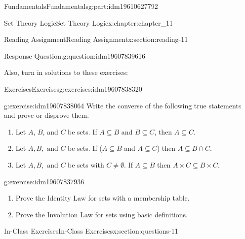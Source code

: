 \documentclass[oneside,10pt,]{book}
\numberwithin{equation}{section}
\begin{document}
\begin{partptx}{Fundamentals}{}{Fundamentals}{}{}{g:part:idm19610627792}
\begin{chapterptx}{Set Theory Logic}{}{Set Theory Logic}{}{}{x:chapter:chapter_11}
\begin{sectionptx}{Reading Assignment}{}{Reading Assignment}{}{}{x:section:reading-11}
\begin{question}{Response Question.}{g:question:idm19607839616}
\end{question}
Also, turn in solutions to these exercises:%
%
%
\typeout{************************************************}
\typeout{************************************************}
%
\begin{exercises-subsection-numberless}{Exercises}{}{Exercises}{}{}{g:exercises:idm19607838320}
\par\medskip\noindent%
%
\begin{exercisegroup}
\begin{divisionexerciseeg}{1}{}{}{g:exercise:idm19607838064}%
Write the converse of the following true statements and prove or disprove them.%
\begin{enumerate}[label=(\alph*)]
\item{}Let \(A\), \(B\), and \(C\) be sets. If \(A\subseteq B\) and \(B\subseteq C\), then \(A\subseteq C\).%
\item{}Let \(A,B, \textrm{ and } C\) be sets. If (\(A\subseteq B\) and \(A\subseteq C\)) then \(A\subseteq B\cap C\).%
\item{}Let \(A,B, \textrm{ and } C\) be sets with \(C\neq \emptyset\). If \(A\subseteq B\) then \(A\times C \subseteq B\times C\).%
\end{enumerate}
%
\end{divisionexerciseeg}%
\begin{divisionexerciseeg}{2}{}{}{g:exercise:idm19607837936}%
%
\begin{enumerate}[label=(\alph*)]
\item{}Prove the Identity Law for sets  with a membership table.%
\item{}Prove the Involution Law  for sets using basic definitions.%
\end{enumerate}
%
\end{divisionexerciseeg}%
\end{exercisegroup}
\par\medskip\noindent
\end{exercises-subsection-numberless}
\end{sectionptx}
%
%
\typeout{************************************************}
\typeout{************************************************}
%
\begin{sectionptx}{In-Class Exercises}{}{In-Class Exercises}{}{}{x:section:questions-11}
%
%
%
\typeout{************************************************}
\typeout{************************************************}

\end{sectionptx}
\end{chapterptx}
\end{partptx}
\end{document}
